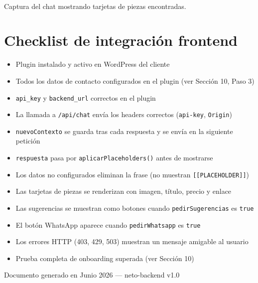 \documentclass[12pt, a4paper]{article}
\newcommand{\capturapendiente}[1]{%
  \begin{tcolorbox}[
    colback=naranjaclaro, colframe=naranjaoscuro,
    title={\small\bfseries\color{naranjaoscuro} Captura de pantalla pendiente},
    fontupper=\small\color{gray},
    left=6pt, right=6pt, top=4pt, bottom=4pt, width=\linewidth
  ]
  \centering{\Large $\square$}\\[4pt]#1
  \end{tcolorbox}
}
\begin{document}
\capturapendiente{Captura del chat mostrando tarjetas de piezas encontradas.}

\section{Checklist de integración frontend}

\begin{tcolorbox}[colback=moradoclaro!50, colframe=moradooscuro,
                  title={\small\bfseries Lista de verificación --- equipo frontend}]
\begin{itemize}[label=$\square$, noitemsep]
  \item Plugin instalado y activo en WordPress del cliente
  \item Todos los datos de contacto configurados en el plugin (ver Sección 10, Paso 3)
  \item \texttt{api\_key} y \texttt{backend\_url} correctos en el plugin
  \item La llamada a \texttt{/api/chat} envía los headers correctos (\texttt{api-key}, \texttt{Origin})
  \item \texttt{nuevoContexto} se guarda tras cada respuesta y se envía en la siguiente petición
  \item \texttt{respuesta} pasa por \texttt{aplicarPlaceholders()} antes de mostrarse
  \item Los datos no configurados eliminan la frase (no muestran \texttt{[[PLACEHOLDER]]})
  \item Las tarjetas de piezas se renderizan con imagen, título, precio y enlace
  \item Las sugerencias se muestran como botones cuando \texttt{pedirSugerencias} es \texttt{true}
  \item El botón WhatsApp aparece cuando \texttt{pedirWhatsapp} es \texttt{true}
  \item Los errores HTTP (403, 429, 503) muestran un mensaje amigable al usuario
  \item Prueba completa de onboarding superada (ver Sección 10)
\end{itemize}
\end{tcolorbox}

\vspace{1.5cm}
\begin{center}
{\small\color{gray}
Documento generado en Junio 2026 --- neto-backend v1.0
}
\end{center}
\end{document}
